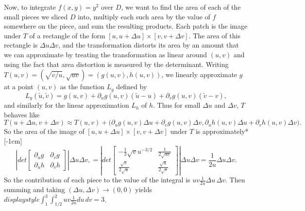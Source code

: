 \documentclass[indent]{watsonbook}
\begin{document}
{\begin{solution}
  Now, to integrate $f(x,y) = y^2$ over $D$, we want to find the area
  of each of the small pieces we sliced $D$ into, multiply each such
  area by the value of $f$ somewhere on the piece, and sum the
  resulting products. Each patch is the image under $T$ of a rectangle
  of the form $[u, u+\Delta u] \times [v, v + \Delta v]$. The area of
  this rectangle is $\Delta u \Delta v$, and the transformation
  distorts its area by an amount that we can approximate by treating
  the transformation as linear around $(u,v)$ and using the fact that
  area distortion is measured by the determinant. Writing
  $T(u,v) = (\sqrt{v/u}, \sqrt{uv}) = (g(u,v), h(u,v))$, we linearly
  approximate $g$ at a point $(u,v)$ as the function $L_g$ defined by
  \[
    L_g(\widetilde{u},\widetilde{v}) = g(u,v) + \partial_ug(u,v)(\widetilde{u} -
    u)+ \partial_vg(u,v)(\widetilde{v} -v),
  \]
  and similarly for the linear approximation $L_h$ of $h$. Thus for
  small $\Delta u$ and $\Delta v$, $T$ behaves like
  \begin{equation} \label{eq:Tuv}
    T(u + \Delta u, v + \Delta v) \approx T(u,v) + \big( \partial_ug(u,v)
    \Delta u + \partial_v g(u,v) \Delta v, \partial_uh(u,v)
    \Delta u + \partial_v h(u,v) \Delta v \big).
  \end{equation}
  So the area of the image of
  $[u, u+\Delta u] \times [v, v + \Delta v]$ under $T$ is
  approximately* [-1cm]
  \[
    \left| {d}et \left[
        \begin{array}{cc}
          \partial_u g & \partial _v g\\
          \partial_u h & \partial _v h
        \end{array} \right]
    \right|\Delta u \Delta v,  =
    \left| {d}et \left[
        \begin{array}{cc}
          -\frac{1}{2}\sqrt{v}u^{-3/2} & \frac{1}{2\sqrt{uv}} \\
          \frac{\sqrt{v}}{2\sqrt{u}} & \frac{\sqrt{u}}{2\sqrt{v}}
        \end{array} \right]
    \right| \Delta u \Delta v  = \frac{1}{2u}
    \Delta u \Delta v.
  \]
  So the contribution of each piece to the value of the integral is
  $uv \frac{1}{2u} \Delta u \, {\Delta}v$. Then summing and taking
  $(\Delta u, \Delta v) \to (0,0)$ yields
  ${d}isplaystyle{\int_{1}^{3}\int_{1/2}^{2}uv \frac{1}{2u} {d} u \,
    {{d}}v = \boxed{3}}$.
\end{solution}

}
\end{document}

